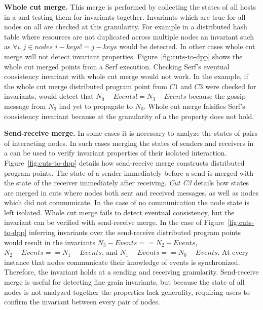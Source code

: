 %
\textbf{Whole cut merge.}  This merge is performed by collecting the
states of all hosts in a \scc and testing them for
invariants together.  Invariants which are true for all nodes on all
\scc are checked at this granularity. For example in a
distributed hash table where resources are not duplicated across
multiple nodes an invariant such as $\forall i,j \in nodes$ $i-keys !=
j-keys$ would be detected.  In other cases whole cut merge will not
detect invariant properties.  Figure~\ref{fig:cuts-to-dpp} shows the
whole cut merged points from a Serf execution. Checking Serf's eventual
consistency invariant with whole cut merge would not work. In the
example, if the whole cut merge distributed program point from $C1$ and
$C3$ were checked for invariants, \dinv would detect that $N_0-Events
!= N_3-Events$ because the gossip message from $N_3$ had yet to
propagate to $N_0$. Whole cut merge falsifies Serf's consistency
invariant because at the granularity of a \scc the property
does not hold.

\textbf{Send-receive merge.} In some cases it is necessary to analyze
the states of pairs of interacting nodes. In such cases merging the
states of senders and receivers in a \scc can be used to verify
invariant properties of their isolated interaction.
Figure~\ref{fig:cuts-to-dpp} details how send-receive merge constructs
distributed program points. The state of a sender immediately before a
send is merged with the state of the receiver immediately after
receiving. \textit{Cut C3} details how states are merged in cuts where
nodes both sent and received messages, as well as nodes which did not
communicate. In the case of no communication the node state is left
isolated. Whole cut merge fails to detect eventual consistency, but
the invariant can be verified with send-receive merge. In the case of
Figure~\ref{fig:cuts-to-dpp} inferring invariants over the
send-receive distributed program points would result in the invariants
$N_3-Events == N_2-Events$, $N_2-Events == N_1-Events$, and
$N_1-Events == N_0-Events$. At every instance that nodes communicate
their knowledge of events is synchronized. Therefore, the invariant
holds at a sending and receiving granularity.  Send-receive merge is
useful for detecting fine grain invariants, but because the state of
all nodes is not analyzed together the properties lack generality,
requiring users to confirm the invariant between every pair of nodes.

